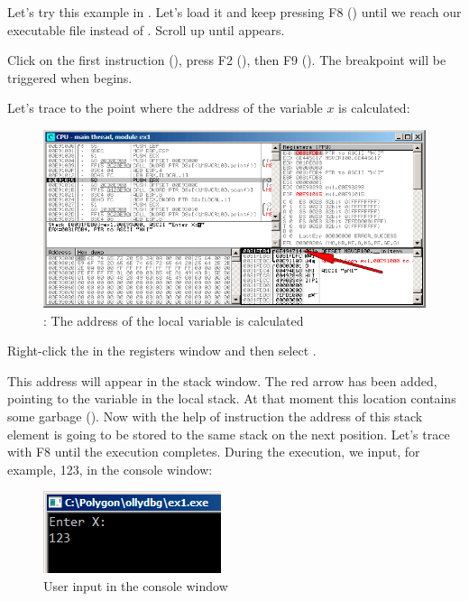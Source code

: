 \clearpage
{}
\myindex{\olly}

Let's try this example in \olly.
Let's load it and keep pressing F8 (\stepover) until we reach our executable file instead of .
Scroll up until \main appears.

Click on the first instruction (), press F2 (), then F9 ().
The breakpoint will be triggered when \main begins.

Let's trace to the point where the address of the variable $x$ is calculated:

\begin{figure}[H]
\centering
\includegraphics[scale=\FigScale]{patterns/04_scanf/1_simple/ex1_olly_1.png}
\caption{\olly: The address of the local variable is calculated}
\label{fig:scanf_ex1_olly_1}
\end{figure}

Right-click the \EAX in the registers window and then select .

This address will appear in the stack window.
The red arrow has been added, pointing to the variable in the local stack.
At that moment this location contains some garbage ().
Now with the help of \PUSH instruction the address of this stack element is going to be stored to the same stack on the next position.
Let's trace with F8 until the \scanf execution completes.
During the \scanf execution, we input, for example, 123, in the console window:

\begin{figure}[H]
\centering
\includegraphics[scale=\NormalScale]{patterns/04_scanf/1_simple/ex1_olly_2.png}
\caption{User input in the console window}
\label{fig:scanf_ex1_olly_2}
\end{figure}

